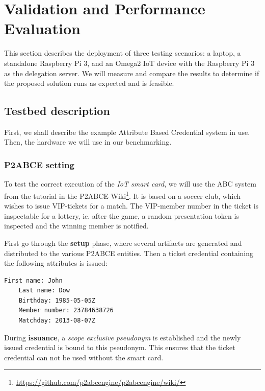 \section{Validation and Performance Evaluation}\label{ch:validation}


This section describes the deployment of three testing scenarios: a laptop, a standalone Raspberry Pi 3, and an Omega2 IoT device with the Raspberry Pi 3 as the delegation server. We will measure and compare the results to determine if the proposed solution runs as expected and is feasible.

\subsection{Testbed description}

First, we shall describe the example Attribute Based Credential system in use. Then, the hardware we will use in our benchmarking.

\subsubsection{P2ABCE setting}

To test the correct execution of the \textit{IoT smart card}, we will use the ABC system from the tutorial in the P2ABCE Wiki\footnote{\url{https://github.com/p2abcengine/p2abcengine/wiki/}}. It is based on a soccer club, which wishes to issue VIP-tickets for a match. The VIP-member number in the ticket is inspectable for a lottery, ie. after the game, a random presentation token is inspected and the winning member is notified.

First go through the \textbf{setup} phase, where several artifacts are generated and distributed to the various P2ABCE entities. Then a ticket credential containing the following attributes is issued:

\begin{Verbatim}[fontsize=\footnotesize]
	First name: John
	Last name: Dow
	Birthday: 1985-05-05Z
	Member number: 23784638726
	Matchday: 2013-08-07Z
\end{Verbatim}

During \textbf{issuance}, a \textit{scope exclusive pseudonym} is established and the newly issued credential is bound to this pseudonym. This ensures that the ticket credential can not be used without the smart card.

